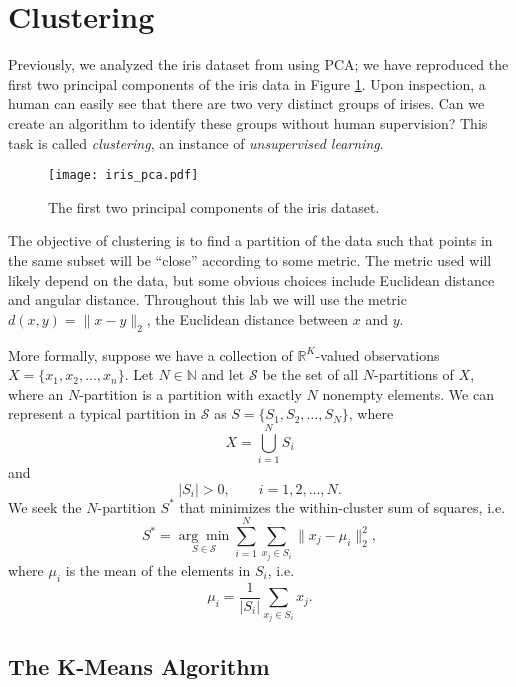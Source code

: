 
\section*{Clustering}

Previously, we analyzed the iris dataset from  using PCA; we have reproduced the first two principal components of the iris data in Figure \ref{fig:iris_data}.
Upon inspection, a human can easily see that there are two very distinct groups of irises.
Can we create an algorithm to identify these groups without human supervision?
This task is called \emph{clustering}, an instance of \emph{unsupervised learning}.

\begin{figure}
\centering
\texttt{[image: iris\_pca.pdf]}
\caption{The first two principal components of the iris dataset.}
\label{fig:iris_data}
\end{figure}

The objective of clustering is to find a partition of the data such that points in the same subset will be ``close'' according to some metric.
The metric used will likely depend on the data, but some obvious choices include Euclidean distance and angular distance.
Throughout this lab we will use the metric $d(x,y) = \|x-y\|_2$, the Euclidean distance between $x$ and $y$.

More formally, suppose we have a collection of $\mathbb{R}^K$-valued observations $X = \{x_1,x_2,\ldots,x_n\}$.
Let $N \in \mathbb{N}$ and let $\mathcal{S}$ be the set of all $N$-partitions of $X$, where an $N$-partition is a partition with exactly $N$ nonempty elements.
We can represent a typical partition in $\mathcal{S}$ as $S = \{S_1,S_2,\ldots,S_N\}$, where
\[
X = \bigcup_{i=1}^N S_i
\]
and
\[
|S_i| > 0, \qquad i=1,2,\ldots,N.
\]
We seek the $N$-partition $S^*$ that minimizes the within-cluster sum of squares, i.e.
\[
S^* = \underset{S\in\mathcal{S}}{\arg\min} \sum_{i=1}^N\sum_{x_j\in S_i}\|x_j-\mu_i\|_2^2,
\]
where $\mu_i$ is the mean of the elements in $S_i$, i.e.
\[
\mu_i = \frac{1}{|S_i|}\sum_{x_j\in S_i}x_j.
\]

\subsection*{The K-Means Algorithm}

